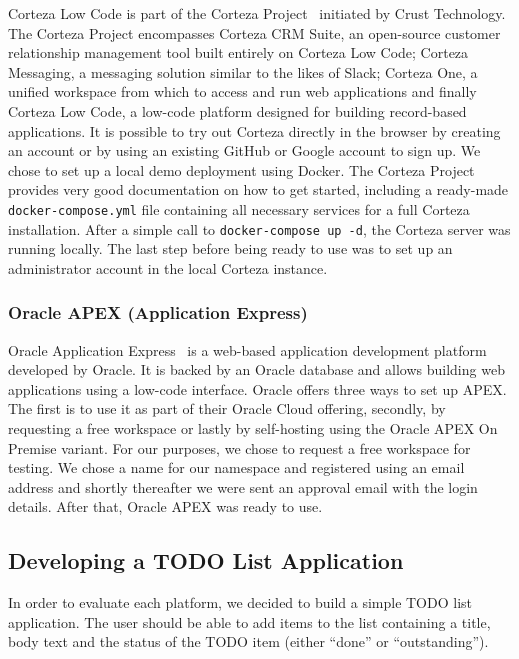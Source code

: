 \documentclass[runningheads]{llncs}
\begin{document}
Corteza Low Code is part of the Corteza Project~\cite{corteza} initiated by Crust Technology. The Corteza Project encompasses Corteza CRM Suite, an open-source customer relationship management tool built entirely on Corteza Low Code; Corteza Messaging, a messaging solution similar to the likes of Slack; Corteza One, a unified workspace from which to access and run web applications and finally Corteza Low Code, a low-code platform designed for building record-based applications. It is possible to try out Corteza directly in the browser by creating an account or by using an existing GitHub or Google account to sign up. We chose to set up a local demo deployment using Docker. The Corteza Project provides very good documentation on how to get started, including a ready-made \texttt{docker-compose.yml} file containing all necessary services for a full Corteza installation. After a simple call to \texttt{docker-compose up -d}, the Corteza server was running locally. The last step before being ready to use was to set up an administrator account in the local Corteza instance.

\subsubsection{Oracle APEX (Application Express)}

Oracle Application Express~\cite{oracle_apex} is a web-based application development platform developed by Oracle. It is backed by an Oracle database and allows building web applications using a low-code interface. Oracle offers three ways to set up APEX. The first is to use it as part of their Oracle Cloud offering, secondly, by requesting a free workspace or lastly by self-hosting using the Oracle APEX On Premise variant. For our purposes, we chose to request a free workspace for testing. We chose a name for our namespace and registered using an email address and shortly thereafter we were sent an approval email with the login details. After that, Oracle APEX was ready to use.

\subsection{Developing a TODO List Application}

In order to evaluate each platform, we decided to build a simple TODO list application. The user should be able to add items to the list containing a title, body text and the status of the TODO item (either “done” or “outstanding”).
\end{document}
